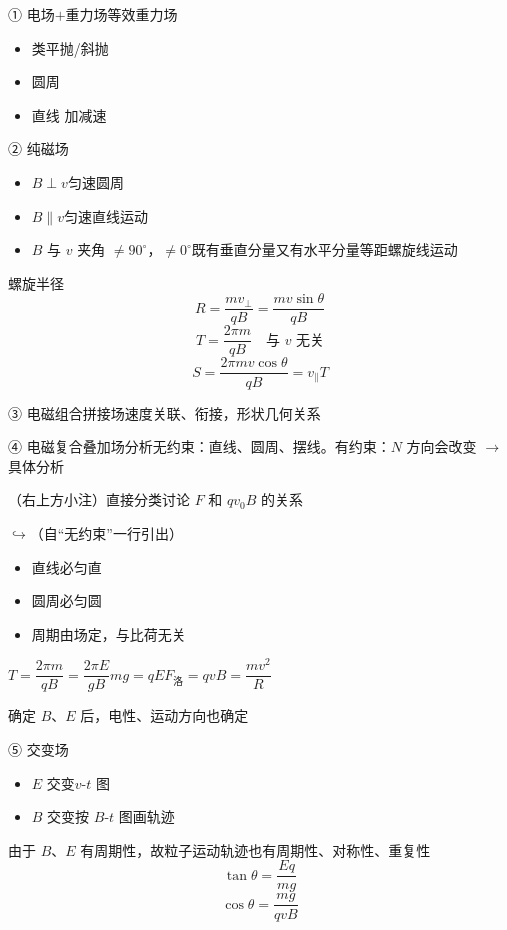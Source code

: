 ① 电场$+$重力场\quad 等效重力场
\begin{itemize}
\item 类平抛/斜抛
\item 圆周
\item 直线 加减速
\end{itemize}

② 纯磁场
\begin{itemize}
\item $B\perp v$\quad 匀速圆周
\item $B\parallel v$\quad 匀速直线运动
\item $B$ 与 $v$ 夹角 $\ne 90^\circ$，$\ne 0^\circ$\quad 既有垂直分量又有水平分量\quad 等距螺旋线运动
\end{itemize}
螺旋半径
\[
R=\frac{mv_{\perp}}{qB}=\frac{mv\sin\theta}{qB}
\]
\[
T=\frac{2\pi m}{qB}\quad\text{与 $v$ 无关}
\]
\[
S=\frac{2\pi mv\cos\theta}{qB}=v_{\parallel}T
\]

③ 电磁组合拼接场\quad 速度关联、衔接，形状几何关系

④ 电磁复合叠加场\quad 分析\quad 无约束：直线、圆周、摆线。有约束：$N$ 方向会改变 $\to$ 具体分析

（右上方小注）直接分类讨论 $F$ 和 $qv_0B$ 的关系
\par\smallskip
$\hookrightarrow$（自“无约束”一行引出）
\begin{itemize}
\item 直线必匀直
\item 圆周必匀圆
\item 周期由场定，与比荷无关
\end{itemize}
$T=\dfrac{2\pi m}{qB}=\dfrac{2\pi E}{gB}$\qquad $mg=qE$\qquad $F_{\text{洛}}=qvB=\dfrac{mv^2}{R}$

确定 $B$、$E$ 后，电性、运动方向也确定

⑤ 交变场
\begin{itemize}
\item $E$ 交变\quad $v$-$t$ 图
\item $B$ 交变\quad 按 $B$-$t$ 图画轨迹
\end{itemize}
由于 $B$、$E$ 有周期性，故粒子运动轨迹也有周期性、对称性、重复性
\[
\tan\theta=\frac{Eq}{mg}
\]
\[
\cos\theta=\frac{mg}{qvB}
\]

